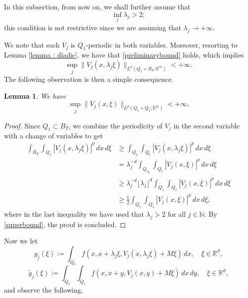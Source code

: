 \documentclass{article}
\newtheorem{lemma}{Lemma}[section]
\theoremstyle{definition}
\newcommand{\N}{\mathbb{N}}
\newcommand{\R}{\mathbb{R}}
\begin{document}
\smallskip

In this subsection, from now on, we shall further assume that
\begin{equation*}
    \inf_j \lambda_j >2;
\end{equation*}
this condition is not restrictive since we are assuming that $\lambda_j\to+\infty$.

We note that each $V_j$ is $Q_1$-periodic in both variables. Moreover, resorting to Lemma \ref{lemma : diadic}, we have that \eqref{preliminarybound} holds, which implies
\begin{equation}\label{superbound}
\sup_{j} \|V_j(x,\lambda_j\xi)\|_{L^p(Q_1\times B_T; \R^m)} <+\infty.
\end{equation}
The following observation is then a simple consequence.

\begin{lemma}\label{lemma : supercritical 1} We have
\begin{equation*}
    \sup_{j} \|V_j(x,\xi)\|_{L^p(Q_1\times Q_1; \R^m)} <+\infty.
\end{equation*}
\end{lemma}
\begin{proof}
    Since $Q_1\subset B_T$, we combine the periodicity of $V_j$ in the second variable with a change of variables to get
\begin{align*}
    \int_{B_T}\int_{Q_1} |V_j(x,\lambda_j\xi)|^p\,dx\,d\xi & \geq \int_{Q_1}\int_{Q_{1}} |V_j(x,\lambda_j\xi)|^p\,dx\,d\xi \\
    & = \lambda_j^{-d}\int_{Q_{\lambda_j}}\int_{Q_{1}} |V_j(x, \xi)|^p\,dx\,d\xi \\
    & \geq \lambda_j^{-d} \lfloor \lambda_j \rfloor^d \int_{Q_1}\int_{Q_{1}} |V_j(x, \xi)|^p\,dx\,d\xi \\
    & \geq \frac{1}{2}\int_{Q_1}\int_{Q_{1}} |V_j(x, \xi)|^p\,dx\,d\xi,
\end{align*}
where in the last inequality we have used that $\lambda_j>2$ for all $j\in\N$. By \eqref{superbound}, the proof is concluded.
\end{proof}

Now we let
\begin{equation*}
    g_j(\xi):= \int_{Q_1} f(x,x+\lambda_j\xi,V_j(x,\lambda_j\xi)+M\xi)\, dx, \quad \xi\in \R^d,
\end{equation*}
\begin{equation*}
    \widetilde{g}_j(\xi):=\int_{Q_1} \int_{Q_1} f(x,x+y,V_j(x,y)+M\xi)\, dx\, dy, \quad \xi\in \R^d,
\end{equation*}
and observe the following.
\end{document}
